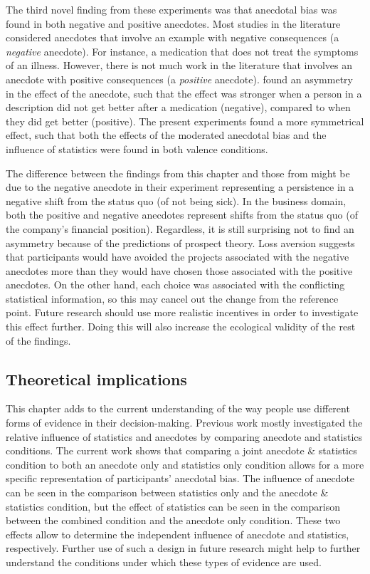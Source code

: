 \documentclass[a4paper, nobind, dvipsnames]{templates/ociamthesis}
\theoremstyle{definition}
\theoremstyle{definition}
\theoremstyle{definition}
\theoremstyle{definition}
\theoremstyle{remark}
\begin{document}
The third novel finding from these experiments was that anecdotal bias was found
in both negative and positive anecdotes. Most studies in the literature
considered anecdotes that involve an example with negative consequences (a
\emph{negative} anecdote). For instance, a medication that does not treat the
symptoms of an illness. However, there is not much work in the literature that
involves an anecdote with positive consequences (a \emph{positive} anecdote).
\textcite{jaramillo2019} found an asymmetry in the effect of the anecdote, such that the
effect was stronger when a person in a description did not get better after a
medication (negative), compared to when they did get better (positive). The
present experiments found a more symmetrical effect, such that both the effects
of the moderated anecdotal bias and the influence of statistics were found in
both valence conditions.

The difference between the findings from this chapter and those from
\textcite{jaramillo2019} might be due to the negative anecdote in their experiment
representing a persistence in a negative shift from the status quo (of not being
sick). In the business domain, both the positive and negative anecdotes
represent shifts from the status quo (of the company's financial position).
Regardless, it is still surprising not to find an asymmetry because of the
predictions of prospect theory. Loss aversion suggests that participants would
have avoided the projects associated with the negative anecdotes more than they
would have chosen those associated with the positive anecdotes. On the other
hand, each choice was associated with the conflicting statistical information,
so this may cancel out the change from the reference point. Future research
should use more realistic incentives in order to investigate this effect
further. Doing this will also increase the ecological validity of the rest of
the findings.

\subsection{Theoretical implications}

This chapter adds to the current understanding of the way people use different
forms of evidence in their decision-making. Previous work mostly investigated
the relative influence of statistics and anecdotes by comparing anecdote and
statistics conditions. The current work shows that comparing a joint anecdote \&
statistics condition to both an anecdote only and statistics only condition
allows for a more specific representation of participants' anecdotal bias. The
influence of anecdote can be seen in the comparison between statistics only and
the anecdote \& statistics condition, but the effect of statistics can be seen in
the comparison between the combined condition and the anecdote only condition.
These two effects allow to determine the independent influence of anecdote and
statistics, respectively. Further use of such a design in future research might
help to further understand the conditions under which these types of evidence
are used.
\end{document}
